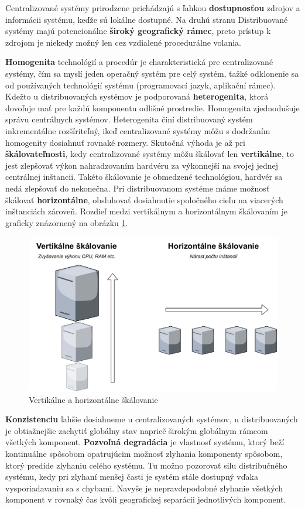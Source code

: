 Centralizované systémy prirodzene prichádzajú s ľahkou \textbf{dostupnosťou} zdrojov a informácii systému, keďže sú lokálne dostupné. Na druhú stranu Distribuované systémy majú potencionálne \textbf{široký geografický rámec}, preto prístup k zdrojom je niekedy možný len cez vzdialené procedurálne volania.

 \textbf{Homogenita} technológií a procedúr je charakteristická pre centralizované systémy, čím sa myslí jeden operačný systém pre celý systém, ťažké odklonenie sa od používaných technológií systému (programovací jazyk, aplikační rámec). Kdežto u distribuovaných systémov je podporovaná \textbf{heterogenita}, ktorá dovoľuje mať pre každú komponentu odlišné prostredie. Homogenita zjednodušuje správu centrálnych systémov. Heterogenita činí distribuovaný systém inkrementálne rozšíriteľný, ikeď centralizované systémy môžu s dodržaním homogenity dosiahnuť rovnaké rozmery. Skutočná výhoda je až pri \textbf{škálovateľnosti}, kedy centralizované systémy môžu škálovať len \textbf{vertikálne}, to jest zlepšovať výkon nahradzovaním hardvéru za výkonnejší na svojej jednej centrálnej inštancii. Takéto škálovanie je obmedzené technológiou, hardvér sa nedá zlepšovať do nekonečna. Pri distribuovanom systéme máme možnosť škálovať \textbf{horizontálne}, obsluhovať dosiahnutie spoločného cieľu na viacerých inštanciách zároveň. Rozdieľ medzi vertikálnym a horizontálnym škálovaním je graficky znázornený na obrázku \ref{fig:scaling}. 

\begin{figure}[H]
	\centering
	\includegraphics[scale=0.6]{obrazky-figures/TR-scaling}
	\caption{Vertikálne a horizontálne škálovanie}
	\label{fig:scaling}
\end{figure}

\textbf{Konzistenciu} ľahšie dosiahneme u centralizovaných systémov, u distribuovaných je obtiažnejšie zachytiť globálny stav naprieč širokým globálnym rámcom všetkých komponent. \textbf{Pozvoľná degradácia} je vlastnosť systému, ktorý beží kontinuálne spôsobom opatrujúcim možnosť zlyhania komponenty spôsobom, ktorý predíde zlyhaniu celého systému. Tu možno pozorovať silu distribučného systému, kedy pri zlyhaní menšej časti je systém stále dostupný vďaka vysporiadavaniu sa s chybami. Navyše je nepravdepodobné zlyhanie všetkých komponent v rovnaký čas kvôli geografickej separácii jednotlivých komponent.

